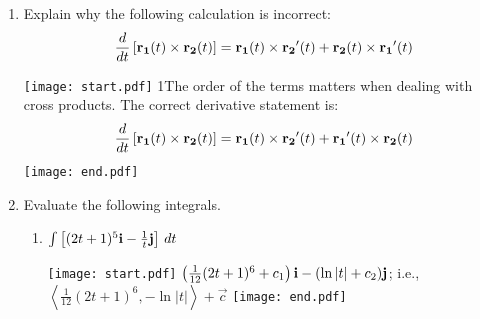 \documentclass[12pt]{article}
\begin{document}
\begin{enumerate}
{\bf Theorem:} \emph{If $\overrightarrow{r}(t)$ is a differentiable vector valued function in 2-space or 3-space, and if $\|\overrightarrow{r}(t)\|$ is constant for all $t$, then $\overrightarrow{r}(t)\cdot\overrightarrow{r}^{\prime}(t)=0$.  That is, $\overrightarrow{r}(t)$ and $\overrightarrow{r}^{\prime}(t)$ are orthogonal vectors for all $t$.}

(Hint: $\|\overrightarrow{r}(t)\|^2=\overrightarrow{r}(t)\cdot\overrightarrow{r}(t)$)

\texttt{[image: start.pdf]}
{{{1\linewidth}{Suppose $\|\overrightarrow{r}(t)\|=k$, where $k$ is constant.  Then:
\begin{align*}
\|\overrightarrow{r}(t)\|^2&=k^2\\
\overrightarrow{r}(t)\cdot\overrightarrow{r}(t)&=k^2\\
\frac{d}{dt}\left[\overrightarrow{r}(t)\cdot\overrightarrow{r}(t)\right]&=\frac{d}{dt}\left(k^2\right)\\
\overrightarrow{r}(t)\cdot \overrightarrow{r}^{\prime}(t)+\overrightarrow{r}^{\prime}(t)\cdot \overrightarrow{r}(t)&=0\\
2\left[\overrightarrow{r}(t)\cdot \overrightarrow{r}^{\prime}(t)\right]&=0\\
\overrightarrow{r}(t)\cdot \overrightarrow{r}^{\prime}(t)&=0
\end{align*}
And, the result is proven.
}}}
\texttt{[image: end.pdf]}


\item Explain why the following calculation is incorrect:
$$\frac{d}{dt}\left[{\bf r_1}(t)\times{\bf r_2}(t)\right]={\bf r_1}(t)\times {\bf r_2}^{\prime}(t)+{\bf r_2}(t)\times{\bf r_1}^{\prime}(t)$$

\texttt{[image: start.pdf]}
{{{1\linewidth}{The order of the terms matters when dealing with cross products.  The correct derivative statement is:
$$\frac{d}{dt}\left[{\bf r_1}(t)\times{\bf r_2}(t)\right]={\bf r_1}(t)\times {\bf r_2}^{\prime}(t)+{\bf r_1}^{\prime}(t)\times{\bf r_2}(t)$$}}}
\texttt{[image: end.pdf]}


\item Evaluate the following integrals.

\begin{enumerate}

\item $\int \left[(2t+1)^5{\bf i}-\frac{1}{t}{\bf j}\right]\,dt$

\texttt{[image: start.pdf]}
{{$\left(\frac{1}{12}(2t+1)^6+c_1\right){\bf i}-(\ln{|t|}+c_2){\bf j}$; i.e., $\left\langle\frac{1}{12}(2t+1)^6,-\ln{|t|}\right\rangle+\overrightarrow{c}$}}
\texttt{[image: end.pdf]}



\end{enumerate}
\end{enumerate}
\end{document}
